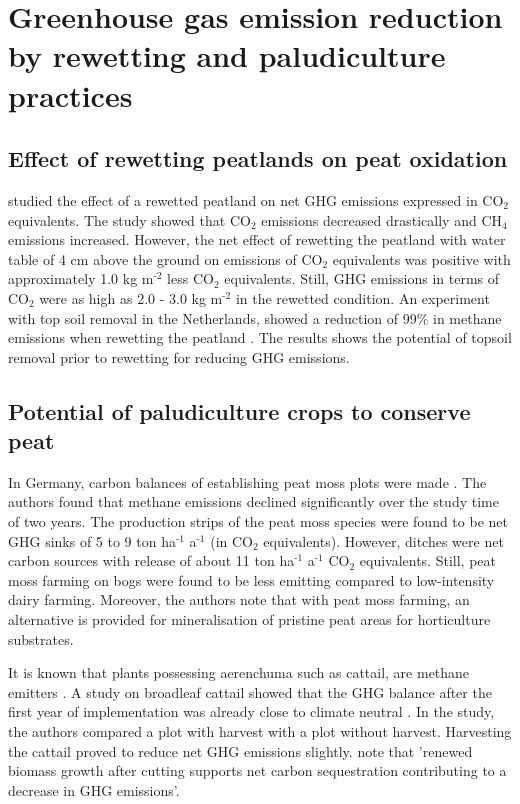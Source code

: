 \documentclass[a4paper,12pt]{scrbook}
\newcommand{\sur}[1]{\ensuremath{^{\textrm{#1}}}}
\newcommand{\sous}[1]{\ensuremath{_{\textrm{#1}}}}
\begin{document}
\section{Greenhouse gas emission reduction by rewetting and paludiculture practices}

\subsection{Effect of rewetting peatlands on peat oxidation}

\citet{van2013rewetting} studied the effect of a rewetted peatland on net GHG emissions expressed in CO\sous{2} equivalents. The study showed that CO\sous{2} emissions decreased drastically and CH\sous{4} emissions increased. However, the net effect of rewetting the peatland with water table of 4 cm above the ground on emissions of CO\sous{2} equivalents was positive with approximately 1.0 kg m\sur{-2} less CO\sous{2} equivalents. Still, GHG emissions in terms of CO\sous{2} were as high as 2.0 - 3.0 kg m\sur{-2} in the rewetted condition. An experiment with top soil removal in the Netherlands, showed a reduction of 99\% in methane emissions when rewetting the peatland \citep{harpenslager2015rewetting}. The results shows the potential of topsoil removal prior to rewetting for reducing GHG emissions. 

\subsection{Potential of paludiculture crops to conserve peat}
In Germany, carbon balances of establishing peat moss plots were made \citep{gunther2017greenhouse}. The authors found that methane emissions declined significantly over the study time of two years. The production strips of the peat moss  species were found to be net GHG sinks of 5 to 9 ton ha\sur{-1} a\sur{-1} (in CO\sous{2} equivalents). However, ditches were net carbon sources with release of about 11 ton ha\sur{-1} a\sur{-1} CO\sous{2} equivalents. Still, peat moss farming on bogs were found to be less emitting compared to low-intensity dairy farming. Moreover, the authors note that with peat moss farming, an alternative is provided for mineralisation of pristine peat areas for horticulture substrates.
 
It is known that plants possessing aerenchuma such as cattail, are methane emitters \citep{wichtmann2016paludiculture}. A study on broadleaf cattail showed that the GHG balance after the first year of implementation was already close to climate neutral \citep{guntherghgtypha}. In the study, the authors compared a plot with harvest with a plot without harvest. Harvesting the cattail proved to reduce net GHG emissions slightly. \citet{wichtmann2016paludiculture} note that 'renewed biomass growth after cutting supports net carbon sequestration contributing to a decrease in GHG emissions'. 
\end{document}
